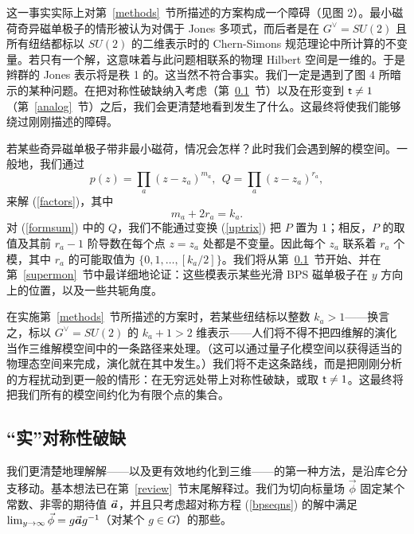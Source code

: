 这一事实实际上对第~\ref{methods}~节所描述的方案构成一个障碍（见图 2）。最小磁荷奇异磁单极子的情形被认为对偶于 Jones 多项式，而后者是在 $G^\vee=SU(2)$ 且所有纽结都标以 $SU(2)$ 的二维表示时的 Chern-Simons 规范理论中所计算的不变量。若只有一个解，这意味着与此问题相联系的物理 Hilbert 空间是一维的。于是辫群的 Jones 表示将是秩 1 的。这当然不符合事实。我们一定是遇到了图 4 所暗示的某种问题。在把对称性破缺纳入考虑（第~\ref{symbr}~节）以及在形变到 ${ \sf t}\not=1$（第~\ref{analog}~节）之后，我们会更清楚地看到发生了什么。这最终将使我们能够绕过刚刚描述的障碍。

若某些奇异磁单极子带非最小磁荷，情况会怎样？此时我们会遇到解的模空间。一般地，我们通过
\begin{equation}\label{formsum} p(z)=
\prod_a(z-z_a)^{m_a},~~ Q=\prod_a(z-z_a)^{r_a},\end{equation}
来解 (\ref{factors})，其中
\begin{equation}\label{tonf}m_a+2r_a=k_a.\end{equation}
对 (\ref{formsum}) 中的 $Q$，我们不能通过变换 (\ref{uptrix}) 把 $P$ 置为 1；相反，$P$ 的取值及其前 $r_a-1$ 阶导数在每个点 $z=z_a$ 处都是不变量。因此每个 $z_a$ 联系着 $r_a$ 个模，其中 $r_a$ 的可能取值为 $\{0,1,\dots, [k_a/2]\}$。我们将从第~\ref{symbr}~节开始、并在第~\ref{supermon}~节中最详细地论证：这些模表示某些光滑 BPS 磁单极子在 $y$ 方向上的位置，以及一些共轭角度。

在实施第~\ref{methods}~节所描述的方案时，若某些纽结标以整数 $k_a>1$——换言之，标以 $G^\vee=SU(2)$ 的 $k_a+1>2$ 维表示——人们将不得不把四维解的演化当作三维解模空间中的一条路径来处理。（这可以通过量子化模空间以获得适当的物理态空间来完成，演化就在其中发生。）我们将不走这条路线，而是把刚刚分析的方程扰动到更一般的情形：在无穷远处带上对称性破缺，或取 ${ \sf t}\not=1$。这最终将把我们所有的模空间约化为有限个点的集合。

\subsection{“实”对称性破缺}\label{symbr}

我们更清楚地理解解——以及更有效地约化到三维——的第一种方法，是沿库仑分支移动。基本想法已在第~\ref{review}~节末尾解释过。我们为切向标量场 $\vec \phi$ 固定某个常数、非零的期待值 $\vec {{\boldsymbol{a}}}$，并且只考虑超对称方程 (\ref{bpseqns}) 的解中满足 $\lim_{y\to \infty}\vec\phi=g \vec {{\boldsymbol{a}}} g^{-1}$（对某个 $g\in G$）的那些。

